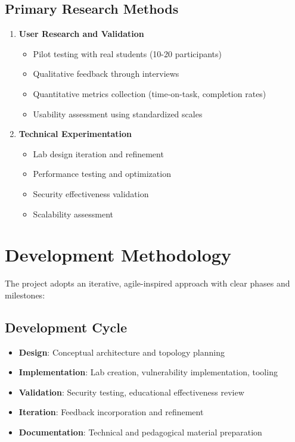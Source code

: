 \subsection{Primary Research Methods}

\begin{enumerate}

\item \textbf{User Research and Validation}
\begin{itemize}
\item Pilot testing with real students (10-20 participants)
\item Qualitative feedback through interviews
\item Quantitative metrics collection (time-on-task, completion rates)
\item Usability assessment using standardized scales
\end{itemize}

\item \textbf{Technical Experimentation}
\begin{itemize}
\item Lab design iteration and refinement
\item Performance testing and optimization
\item Security effectiveness validation
\item Scalability assessment
\end{itemize}

\end{enumerate}

\section{Development Methodology}

The project adopts an iterative, agile-inspired approach with clear phases and milestones:

\subsection{Development Cycle}

\begin{itemize}

\item \textbf{Design}: Conceptual architecture and topology planning
\item \textbf{Implementation}: Lab creation, vulnerability implementation, tooling
\item \textbf{Validation}: Security testing, educational effectiveness review
\item \textbf{Iteration}: Feedback incorporation and refinement
\item \textbf{Documentation}: Technical and pedagogical material preparation

\end{itemize}

